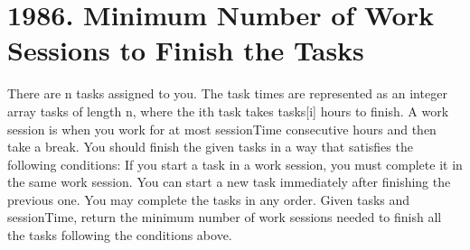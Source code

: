 \documentclass[9pt, b5paaper]{book}
\begin{document}
\section{1986. Minimum Number of Work Sessions to Finish the Tasks}
\label{sec-11-7}
There are n tasks assigned to you. The task times are represented as an integer array tasks of length n, where the ith task takes tasks[i] hours to finish. A work session is when you work for at most sessionTime consecutive hours and then take a break.
You should finish the given tasks in a way that satisfies the following conditions:
If you start a task in a work session, you must complete it in the same work session.
You can start a new task immediately after finishing the previous one.
You may complete the tasks in any order.
Given tasks and sessionTime, return the minimum number of work sessions needed to finish all the tasks following the conditions above.
\end{document}
